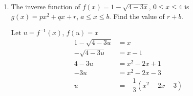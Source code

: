 \documentclass{report}
\begin{document}
\begin{enumerate}
    \item The inverse function of $f(x) = 1 - \sqrt{4 - 3x}$, $0 \leq x \leq 4$ is $g(x) = px^2 + qx + r$, $a \leq x \leq b$. Find the value of $r + b$.

          Let $u = f^{-1}(x)$, $f(u) = x$
          \begin{align*}
              1 - \sqrt{4 - 3u} & = x                           \\
              - \sqrt{4 - 3u}   & = x - 1                       \\
              4 - 3u            & = x^2 - 2x + 1                \\
              -3u               & = x^2 - 2x - 3                \\
              u                 & = -\dfrac{1}{3}(x^2 - 2x - 3)
          \end{align*}

\end{enumerate}
\end{document}
